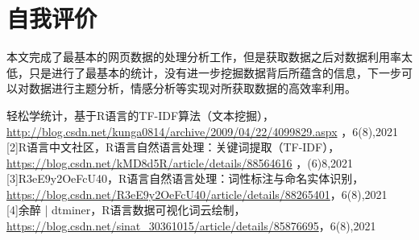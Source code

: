 \documentclass[a4paper,12pt]{ctexart}     %
\begin{document}
	\section{自我评价}
	
	本文完成了最基本的网页数据的处理分析工作，但是获取数据之后对数据利用率太低，只是进行了最基本的统计，没有进一步挖掘数据背后所蕴含的信息，下一步可以对数据进行主题分析，情感分析等实现对所获取数据的高效率利用。
	
	
	\begin{thebibliography}{99}    %
		\par
	[1]轻松学统计，基于R语言的TF-IDF算法（文本挖掘），\url{http://blog.csdn.net/kunga0814/archive/2009/04/22/4099829.aspx} ，6(8),2021 
	\\


	[2]R语言中文社区，R语言自然语言处理：关键词提取（TF-IDF），\url{https://blog.csdn.net/kMD8d5R/article/details/88564616} ，(6)8,2021
	\\
	
	
	[3]R3eE9y2OeFcU40，R语言自然语言处理：词性标注与命名实体识别，\url{https://blog.csdn.net/R3eE9y2OeFcU40/article/details/88265401}，6(8),2021
	\\
	
	
	[4]余醉 | dtminer，R语言数据可视化词云绘制，\url{https://blog.csdn.net/sinat_30361015/article/details/85876695}，6(8),2021
	\end{thebibliography}

\end{document}
